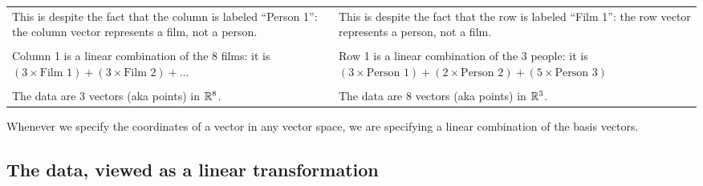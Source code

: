 \begin{tabular}{|p{8cm}|p{8 cm}|}
  This is despite the fact that the column is labeled ``Person 1'': the column vector represents a film, not a person.
  &This is despite the fact that the row is labeled ``Film 1'': the row vector represents a person, not a film.\\
  &\\

  Column 1 is a linear combination of the 8 films: it is
  $(3 \times \text{Film 1}) + (3 \times \text{Film 2}) + \ldots$
  &Row 1 is a linear combination of the 3 people: it is
    $(3 \times \text{Person 1}) + (2 \times \text{Person 2}) + (5 \times \text{Person 3})$\\
  &\\

  The data are 3 vectors (aka points) in $\mathbb{R}^8$.
  &The data are 8 vectors (aka points) in $\mathbb{R}^3$.
\end{tabular}

Whenever we specify the coordinates of a vector in any vector space, we are specifying a linear
combination of the basis vectors.

\newpage
\subsection*{The data, viewed as a linear transformation}

